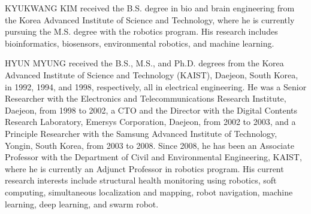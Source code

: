 \documentclass{ieeeaccess}
\begin{document}
\begin{IEEEbiography}{KYUKWANG KIM}
received the B.S. degree in bio and brain engineering from the Korea Advanced Institute of Science and Technology, where he is currently pursuing the M.S. degree with the robotics program. His research includes bioinformatics, biosensors, environmental robotics, and machine learning.
\end{IEEEbiography}

\begin{IEEEbiography}{HYUN MYUNG} 
received the B.S., M.S., and Ph.D. degrees from the Korea Advanced Institute of Science and Technology (KAIST), Daejeon, South Korea, in 1992, 1994, and 1998, respectively, all in electrical engineering. He was a Senior Researcher with the Electronics and Telecommunications Research Institute, Daejeon, from 1998 to 2002, a CTO and the Director with the Digital Contents Research Laboratory, Emersys Corporation, Daejeon, from 2002 to 2003, and a Principle Researcher with the Samsung Advanced Institute of Technology, Yongin, South Korea, from 2003 to 2008. Since 2008, he has been an Associate Professor with the Department of Civil and Environmental Engineering, KAIST, where he is currently an Adjunct Professor in robotics program. His current research interests include structural health monitoring using robotics, soft computing, simultaneous localization and mapping, robot navigation, machine learning, deep learning, and swarm robot.  
\end{IEEEbiography}

\EOD
\end{document}
